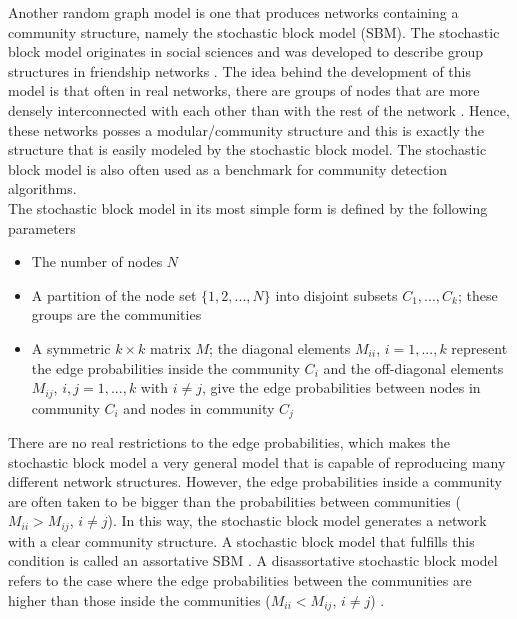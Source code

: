 \documentclass[11 pt , letterpaper , twoside , openright]{book}
\begin{document}
Another random graph model is one that produces networks containing a community structure, namely the stochastic block model (SBM). The stochastic block model originates in social sciences and was developed to describe group structures in friendship networks \cite{Funke2019}. The idea behind the development of this model is that often in real networks, there are groups of nodes that are more densely interconnected with each other than with the rest of the network \cite{F.Costa2007}. Hence, these networks posses a modular/community structure and this is exactly the structure that is easily modeled by the stochastic block model. The stochastic block model is also often used as a benchmark for community detection algorithms.\\
\newline
The stochastic block model in its most simple form is defined by the following parameters \cite{Clauset2017}
\begin{itemize}
	\item The number of nodes $N$ 
	\item A partition of the node set $\{1, 2, ..., N\}$ into disjoint subsets $C_1, ..., C_k$; these groups are the communities
	\item A symmetric $k\times k$ matrix $M$; the diagonal elements $M_{ii}$, $i = 1, ..., k$ represent the edge probabilities inside the community $C_i$ and the off-diagonal elements $M_{ij}$, $i, j = 1, ..., k$ with $i \neq j$, give the edge probabilities between nodes in community $C_i$ and nodes in community $C_j$
\end{itemize}
There are no real restrictions to the edge probabilities, which makes the stochastic block model a very general model that is capable of reproducing many different network structures. However, the edge probabilities inside a community are often taken to be bigger than the probabilities between communities ($M_{ii} > M_{ij}$, $i \neq j$). In this way, the stochastic block model generates a network with a clear community structure. A stochastic block model that fulfills this condition is called an assortative SBM \cite{Lee2019}. A disassortative stochastic block model refers to the case where the edge probabilities between the communities are higher than those inside the communities ($M_{ii} < M_{ij}$, $i \neq j$) \cite{Gribel2020}.\\
\newline
\end{document}
